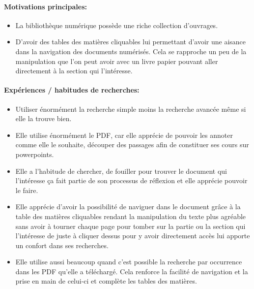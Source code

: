 \paragraph*{Motivations principales:} 
\begin{itemize}
	\item La bibliothèque numérique possède une riche collection d’ouvrages.
\item D’avoir des tables des matières cliquables lui permettant d’avoir une aisance dans la navigation des documents numérisés. Cela se rapproche un peu de la manipulation que l’on peut avoir avec un livre papier pouvant aller directement à la section qui l’intéresse.
\end{itemize}
\paragraph*{Expériences / habitudes de recherches:}
\begin{itemize}
	\item Utiliser énormément la recherche simple moins la recherche avancée même si elle la trouve bien. 
\item Elle utilise énormément le PDF, car elle apprécie de pouvoir les annoter comme elle le souhaite, découper des passages afin de constituer ses cours sur powerpoints. 
\item Elle a l’habitude de chercher, de fouiller pour trouver le document qui l’intéresse ça fait partie de son processus de réflexion et elle apprécie pouvoir le faire.
\item Elle apprécie d’avoir la possibilité de naviguer dans le document grâce à la table des matières cliquables rendant la manipulation du texte plus agréable sans avoir à tourner chaque page pour tomber sur la partie ou la section qui l’intéresse de juste à cliquer dessus pour y avoir directement accès lui apporte un confort dans ses recherches.
\item Elle utilise aussi beaucoup quand c’est possible la recherche par occurrence dans les PDF qu’elle a téléchargé. Cela renforce la facilité de navigation et la prise en main de celui-ci et complète les tables des matières.
\end{itemize}
